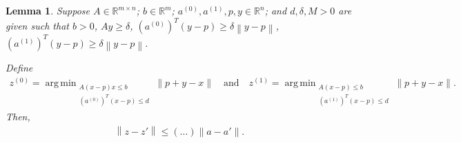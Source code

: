 \documentclass{article}
\newtheorem{lemma}[theorem]{Lemma}
\theoremstyle{case}
\numberwithin{theorem}{subsection}
\DeclareMathOperator*{\argmin}{arg\,min}
\newcommand{\reals}{\mathbb R}
\newcommand{\Rm}{\mathbb R^m}
\newcommand{\Rn}{\mathbb R^n}
\begin{document}
\begin{lemma}
Suppose
$A \in \reals^{m \times n}$;
$b \in \Rm$;
$a^{(0)}, a^{(1)}, p, y \in \Rn$;
and $d, \delta, M > 0$
are given such that
$b > 0$,
$A y \ge \delta$, 
$\left(a^{(0)}\right)^T(y - p) \ge \delta \left\|y - p\right\|$,
$\left(a^{(1)}\right)^T(y - p) \ge \delta \left\|y - p\right\|$.

Define
\begin{align*}
z^{(0)}  = \argmin_{\substack{A(x - p)x \le b \\ \left(a^{(0)}\right)^T \left(x - p\right) \le d}} \|p + y - x\|
\quad \textrm{and} \quad
z^{(1)} = \argmin_{\substack{A(x - p) \le b \\ \left(a^{(1)}\right)^T \left(x - p\right) \le d}} \|p + y - x\|.
\end{align*}
Then, 
\begin{align*}
\left\|z - z'\right\| \le \left(\ldots\right) \|a - a'\|.
\end{align*}
\end{lemma}
\end{document}
